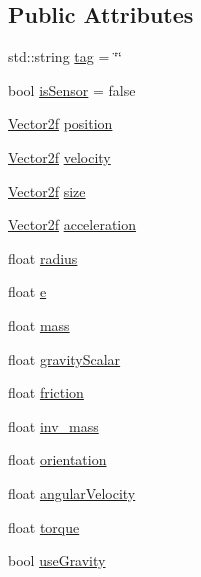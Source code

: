 \subsection*{Public Attributes}
\begin{DoxyCompactItemize}
\item 
std\+::string \mbox{\hyperlink{class_physics_body_a1885d18cacc5d8ac866a4d62612a169c}{tag}} = \char`\"{}\char`\"{}
\item 
bool \mbox{\hyperlink{class_physics_body_adf84f20d337a9611bae830e2261b2d37}{is\+Sensor}} = false
\item 
\mbox{\hyperlink{class_vector2f}{Vector2f}} \mbox{\hyperlink{class_physics_body_a31e35fb660f35dc92680698f3f4a7370}{position}}
\item 
\mbox{\hyperlink{class_vector2f}{Vector2f}} \mbox{\hyperlink{class_physics_body_a8a2c10fcb6da06fc46270a570b1fadf7}{velocity}}
\item 
\mbox{\hyperlink{class_vector2f}{Vector2f}} \mbox{\hyperlink{class_physics_body_a3bb57b0ab32d6865a3e01f7a72291e38}{size}}
\item 
\mbox{\hyperlink{class_vector2f}{Vector2f}} \mbox{\hyperlink{class_physics_body_aa7bce22d92646ebfb7bfd218b9b31435}{acceleration}}
\item 
float \mbox{\hyperlink{class_physics_body_aa1942a3f85f7678d83a0670e73d9e9a5}{radius}}
\item 
float \mbox{\hyperlink{class_physics_body_a16280661c0d94d4e2394083b085aeeb4}{e}}
\item 
float \mbox{\hyperlink{class_physics_body_ad8617ab5d898b415d5fc0dc67d5ae78a}{mass}}
\item 
float \mbox{\hyperlink{class_physics_body_acc74712fb2d68c81878f95faca5fbb62}{gravity\+Scalar}}
\item 
float \mbox{\hyperlink{class_physics_body_ab3e6147de0da0c9f2f7caf07e2787878}{friction}}
\item 
float \mbox{\hyperlink{class_physics_body_a4dc0e4096eb52bc8fa4fac85d5b0fe09}{inv\+\_\+mass}}
\item 
float \mbox{\hyperlink{class_physics_body_a487c045e84ff4fc66cd653febeb01d8b}{orientation}}
\item 
float \mbox{\hyperlink{class_physics_body_a132ee8b8b787694def109f1f2ae6a943}{angular\+Velocity}}
\item 
float \mbox{\hyperlink{class_physics_body_a504b14e16e214adf0021311a40f68dfb}{torque}}
\item 
bool \mbox{\hyperlink{class_physics_body_a69b18d144228eccd2a82c86fcdebe9b5}{use\+Gravity}}

\end{DoxyCompactItemize}
